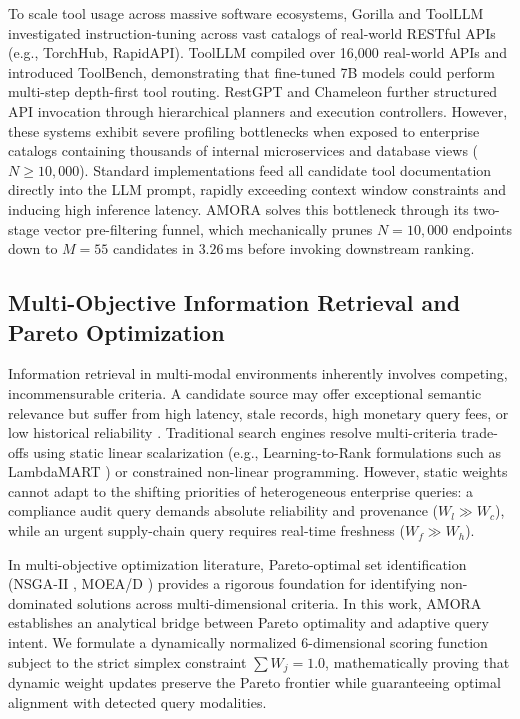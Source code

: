 \documentclass[conference,onecolumn,10pt]{IEEEtran}
\begin{document}
To scale tool usage across massive software ecosystems, Gorilla \cite{patil2023gorilla} and ToolLLM \cite{qin2023toolllm} investigated instruction-tuning across vast catalogs of real-world RESTful APIs (e.g., TorchHub, RapidAPI). ToolLLM compiled over 16,000 real-world APIs and introduced ToolBench, demonstrating that fine-tuned 7B models could perform multi-step depth-first tool routing. RestGPT \cite{song2023restgpt} and Chameleon \cite{lu2023chameleon} further structured API invocation through hierarchical planners and execution controllers. However, these systems exhibit severe profiling bottlenecks when exposed to enterprise catalogs containing thousands of internal microservices and database views ($N \ge 10{,}000$). Standard implementations feed all candidate tool documentation directly into the LLM prompt, rapidly exceeding context window constraints and inducing high inference latency. AMORA solves this bottleneck through its two-stage vector pre-filtering funnel, which mechanically prunes $N=10{,}000$ endpoints down to $M=55$ candidates in $3.26\,\text{ms}$ before invoking downstream ranking.

\subsection{Multi-Objective Information Retrieval and Pareto Optimization}
Information retrieval in multi-modal environments inherently involves competing, incommensurable criteria. A candidate source may offer exceptional semantic relevance but suffer from high latency, stale records, high monetary query fees, or low historical reliability \cite{miettinen1999multiobjective,deb2001multi}. Traditional search engines resolve multi-criteria trade-offs using static linear scalarization (e.g., Learning-to-Rank formulations such as LambdaMART \cite{burges2010lambdamart}) or constrained non-linear programming. However, static weights cannot adapt to the shifting priorities of heterogeneous enterprise queries: a compliance audit query demands absolute reliability and provenance ($W_l \gg W_c$), while an urgent supply-chain query requires real-time freshness ($W_f \gg W_h$).

In multi-objective optimization literature, Pareto-optimal set identification (NSGA-II \cite{deb2002fast}, MOEA/D \cite{zhang2007moea}) provides a rigorous foundation for identifying non-dominated solutions across multi-dimensional criteria. In this work, AMORA establishes an analytical bridge between Pareto optimality and adaptive query intent. We formulate a dynamically normalized 6-dimensional scoring function subject to the strict simplex constraint $\sum W_j = 1.0$, mathematically proving that dynamic weight updates preserve the Pareto frontier while guaranteeing optimal alignment with detected query modalities.
\end{document}
